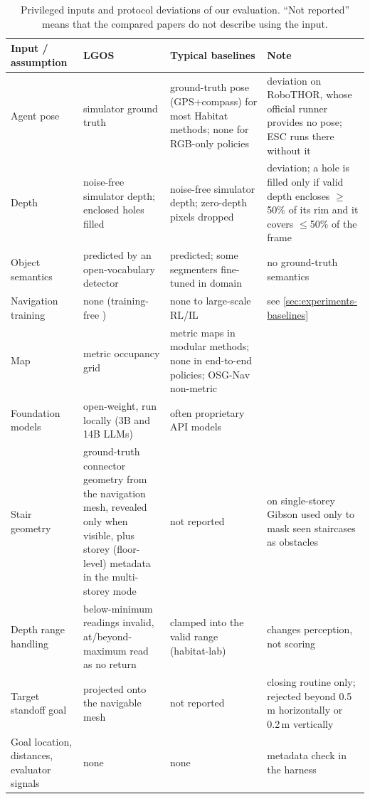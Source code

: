 \documentclass[10pt]{article}
\newcommand{\ours}{LGOS\xspace}
\newcommand{\cmark}{\checkmark}
\begin{document}
\begin{table}[tp]
  \centering
  \footnotesize
  \setlength{\tabcolsep}{4pt}
  \caption{Privileged inputs and protocol deviations of our evaluation. ``Not reported'' means that the compared
  papers do not describe using the input.}
  \label{tab:privileges}
  \begin{tabular}{@{}p{2.55cm}p{3.6cm}p{3.35cm}p{4.6cm}@{}}
    \toprule
    Input / assumption & \ours & Typical baselines & Note \\
    \midrule
    Agent pose & simulator ground truth & ground-truth pose (GPS+compass) for most Habitat methods; none for
      RGB-only policies & deviation on RoboTHOR, whose official runner provides no pose; ESC runs there without it \\
    Depth & noise-free simulator depth; enclosed holes filled & noise-free simulator depth; zero-depth pixels dropped
      & deviation; a hole is filled only if valid depth encloses $\geq$50\% of its rim and it covers $\leq$50\% of
      the frame \\
    Object semantics & predicted by an open-vocabulary detector & predicted; some segmenters fine-tuned in domain & no
      ground-truth semantics \\
    Navigation training & none (training-free \cmark) & none to large-scale RL/IL & see \cref{sec:experiments-baselines} \\
    Map & metric occupancy grid & metric maps in modular methods; none in end-to-end policies; OSG-Nav non-metric
      & \\
    Foundation models & open-weight, run locally (3B and 14B LLMs) & often proprietary API models & \\
    Stair geometry & ground-truth connector geometry from the navigation mesh, revealed only when visible, plus
      storey (floor-level) metadata in the multi-storey mode & not reported & on single-storey Gibson used only to
      mask seen staircases as obstacles \\
    Depth range handling & below-minimum readings invalid, at/beyond-maximum read as no return & clamped into the
      valid range (habitat-lab) & changes perception, not scoring \\
    Target standoff goal & projected onto the navigable mesh & not reported & closing routine only; rejected beyond
      0.5\,m horizontally or 0.2\,m vertically \\
    Goal location, distances, evaluator signals & none & none & metadata check in the harness \\

\end{tabular}
\end{table}
\end{document}

